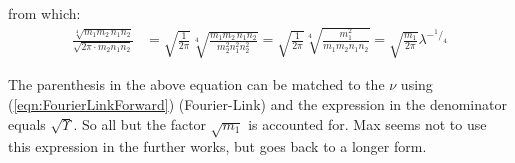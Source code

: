 \documentclass[
	english,
	a4paper,
	fontsize=10pt,
	parskip=half,
	titlepage=true,
	DIV=12,
	final
]{scrreprt}
\newcommand*{\smallfrac}  [2]{\ensuremath{{}^        {#1} \!/_        {#2}}}
\begin{document}
from which:
\begin{align*}
	\frac
		{\sqrt[4]{m_1 m_2 \, n_1 n_2}}
		{\sqrt{2\pi \cdot m_2 n_1 n_2}}
&=
	\sqrt{\frac{1}{2\pi}}
	\sqrt[4]{\frac
		{m_1 m_2 \, n_1 n_2}
		{m_2^2 n_1^2 n_2^2}
	}
=
	\sqrt{\frac{1}{2\pi}}
	\sqrt[4]{\frac
		{m_1^2 }
		{m_1 m_2 n_1 n_2}
	}
=
	\sqrt{\frac{m_1}{2\pi}} \lambda^{-\smallfrac{1}{4}}
\end{align*}

The parenthesis in the above equation can be matched to the $\nu$ using (\ref{eqn:FourierLinkForward}) (Fourier-Link) and the expression in the denominator equals $\sqrt{\Upsilon}$. So {\color{red} all but the factor $\sqrt{m_1}$} is accounted for. Max seems not to use this expression in the further works, but goes back to a longer form.
\end{document}
